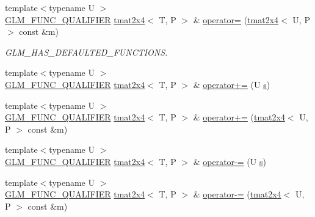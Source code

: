 \begin{DoxyCompactItemize}
\item 
{\footnotesize template$<$typename U $>$ }\\\mbox{\hyperlink{setup_8hpp_a33fdea6f91c5f834105f7415e2a64407}{G\+L\+M\+\_\+\+F\+U\+N\+C\+\_\+\+Q\+U\+A\+L\+I\+F\+I\+ER}} \mbox{\hyperlink{structglm_1_1tmat2x4}{tmat2x4}}$<$ T, P $>$ \& \mbox{\hyperlink{structglm_1_1tmat2x4_abc6565efeca20fb615abcc146b78efa2}{operator=}} (\mbox{\hyperlink{structglm_1_1tmat2x4}{tmat2x4}}$<$ U, P $>$ const \&m)
\begin{DoxyCompactList}\small\item\em G\+L\+M\+\_\+\+H\+A\+S\+\_\+\+D\+E\+F\+A\+U\+L\+T\+E\+D\+\_\+\+F\+U\+N\+C\+T\+I\+O\+NS. \end{DoxyCompactList}\item 
{\footnotesize template$<$typename U $>$ }\\\mbox{\hyperlink{setup_8hpp_a33fdea6f91c5f834105f7415e2a64407}{G\+L\+M\+\_\+\+F\+U\+N\+C\+\_\+\+Q\+U\+A\+L\+I\+F\+I\+ER}} \mbox{\hyperlink{structglm_1_1tmat2x4}{tmat2x4}}$<$ T, P $>$ \& \mbox{\hyperlink{structglm_1_1tmat2x4_a9acecf4bd516667aff87e24d998abdbe}{operator+=}} (U \mbox{\hyperlink{glad_8h_af1b1d5edfea6a34daee7389b1b5810ad}{s}})
\item 
{\footnotesize template$<$typename U $>$ }\\\mbox{\hyperlink{setup_8hpp_a33fdea6f91c5f834105f7415e2a64407}{G\+L\+M\+\_\+\+F\+U\+N\+C\+\_\+\+Q\+U\+A\+L\+I\+F\+I\+ER}} \mbox{\hyperlink{structglm_1_1tmat2x4}{tmat2x4}}$<$ T, P $>$ \& \mbox{\hyperlink{structglm_1_1tmat2x4_aba7049b76997321c5966fcfb72d2655d}{operator+=}} (\mbox{\hyperlink{structglm_1_1tmat2x4}{tmat2x4}}$<$ U, P $>$ const \&m)
\item 
{\footnotesize template$<$typename U $>$ }\\\mbox{\hyperlink{setup_8hpp_a33fdea6f91c5f834105f7415e2a64407}{G\+L\+M\+\_\+\+F\+U\+N\+C\+\_\+\+Q\+U\+A\+L\+I\+F\+I\+ER}} \mbox{\hyperlink{structglm_1_1tmat2x4}{tmat2x4}}$<$ T, P $>$ \& \mbox{\hyperlink{structglm_1_1tmat2x4_affe8a407491e92988ba4e27c7971013b}{operator-\/=}} (U \mbox{\hyperlink{glad_8h_af1b1d5edfea6a34daee7389b1b5810ad}{s}})
\item 
{\footnotesize template$<$typename U $>$ }\\\mbox{\hyperlink{setup_8hpp_a33fdea6f91c5f834105f7415e2a64407}{G\+L\+M\+\_\+\+F\+U\+N\+C\+\_\+\+Q\+U\+A\+L\+I\+F\+I\+ER}} \mbox{\hyperlink{structglm_1_1tmat2x4}{tmat2x4}}$<$ T, P $>$ \& \mbox{\hyperlink{structglm_1_1tmat2x4_a2413a5e38ef62a695afd3625b576f8a4}{operator-\/=}} (\mbox{\hyperlink{structglm_1_1tmat2x4}{tmat2x4}}$<$ U, P $>$ const \&m)

\end{DoxyCompactItemize}
